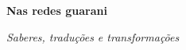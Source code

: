 


\begingroup\thispagestyle{empty}\vspace*{.05\textheight} 


            \formular
            \Huge 
            \noindent
            \textbf{Nas redes guarani}


            \vspace{0.3em}

            \noindent\large\textit{Saberes, traduções e transformações}
                    
\endgroup
\vfill
\pagebreak